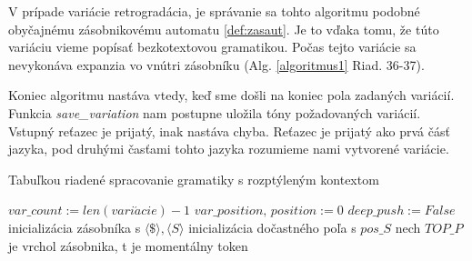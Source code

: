 V prípade variácie retrogradácia, je správanie sa tohto algoritmu podobné obyčajnému zásobnikovému automatu \ref{def:zasaut}. Je to vďaka tomu, že túto variáciu vieme popísať bezkotextovou gramatikou. Počas tejto variácie sa nevykonáva expanzia vo vnútri zásobníku (Alg. \ref{algoritmus1} Riad. 36-37).

Koniec algoritmu nastáva vtedy, keď sme došli na koniec pola zadaných variácií. Funkcia \textit{save\_variation} nam postupne uložila tóny požadovaných variácií. Vstupný reťazec je prijatý, inak nastáva chyba. Reťazec je prijatý ako prvá čásť jazyka, pod druhými časťami tohto jazyka rozumieme nami vytvorené variácie.

\begin{algorithm}
\label{algoritmus1}
\SetNlSkip{-1em}
\caption{Tabuľkou riadené spracovanie gramatiky s rozptýleným kontextom}
\SetNlSty{}{}{:}
\SetStartEndCondition{ }{}{}%
%
%
%
\AlgoDontDisplayBlockMarkers\SetAlgoNoEnd\SetAlgoNoLine%
\Indp
\Indpp
\medskip
$var\_count := len(vari\acute{a}cie) - 1$\;
$var\_position,\, position := 0$\;
$deep\_push := False$\;
inicializácia zásobníka s $\langle \$ \rangle, \langle S \rangle$\;
inicializácia dočastného poľa s $pos\_S$\;
     {
        nech $TOP\_P$ je vrchol zásobnika, t je momentálny token\;
    }
\end{algorithm}

